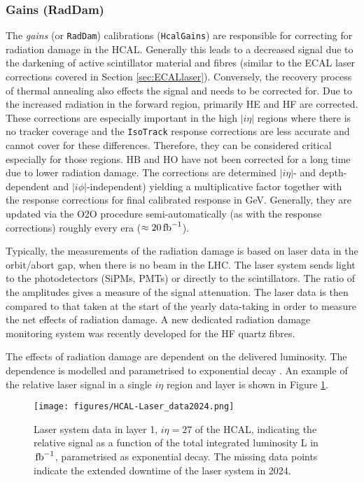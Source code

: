 \subsubsection{Gains (RadDam)}\label{sec:HCAL_gains}
The \textit{gains} (or \texttt{RadDam}) calibrations (\texttt{HcalGains}) are responsible for correcting for radiation damage in the HCAL. Generally this leads to a decreased signal due to the darkening of active scintillator material and fibres (similar to the ECAL laser corrections covered in Section \ref{sec:ECALlaser}). Conversely, the recovery process of thermal annealing also effects the signal and needs to be corrected for. Due to the increased radiation in the forward region, primarily HE and HF are corrected. These corrections are especially important in the high $|i\eta|$ regions where there is no tracker coverage and the \texttt{IsoTrack} response corrections are less accurate and cannot cover for these differences. Therefore, they can be considered critical especially for those regions. HB and HO have not been corrected for a long time due to lower radiation damage. The corrections are determined $|i\eta|$- and depth-dependent and $|i\phi|$-independent) yielding a multiplicative factor together with the response corrections for final calibrated response in GeV. Generally, they are updated via the O2O procedure semi-automatically (as with the response corrections) roughly every era ($\approx 20 \mbox{\ensuremath{\,\text{fb}^{-1}}}$).

Typically, the measurements of the radiation damage is based on laser data in the orbit/abort gap, when there is no beam in the LHC. The laser system sends light to the photodetectors (SiPMs, PMTs) or directly to the scintillators. The ratio of the amplitudes gives a measure of the signal attenuation. The laser data is then compared to that taken at the start of the yearly data-taking in order to measure the net effects of radiation damage. A new dedicated radiation damage monitoring system was recently developed for the HF quartz fibres. 

The effects of radiation damage are dependent on the delivered luminosity. The dependence is modelled and parametrised to exponential decay \cite{CMS-PRF-18-003}. An example of the relative laser signal in a single $i\eta$ region and layer is shown in Figure \ref{fig:HCAL-Laser_data}. 

\begin{figure}[h!]	
\centering
\texttt{[image: figures/HCAL-Laser\_data2024.png]} %
\caption{Laser system data in layer 1, $i\eta = 27$ of the HCAL, indicating the relative signal as a function of the total integrated luminosity L in $\mbox{\ensuremath{\,\text{fb}^{-1}}}$, parametrised as exponential decay. The missing data points indicate the extended downtime of the laser system in 2024.}
\label{fig:HCAL-Laser_data}
\end{figure}

